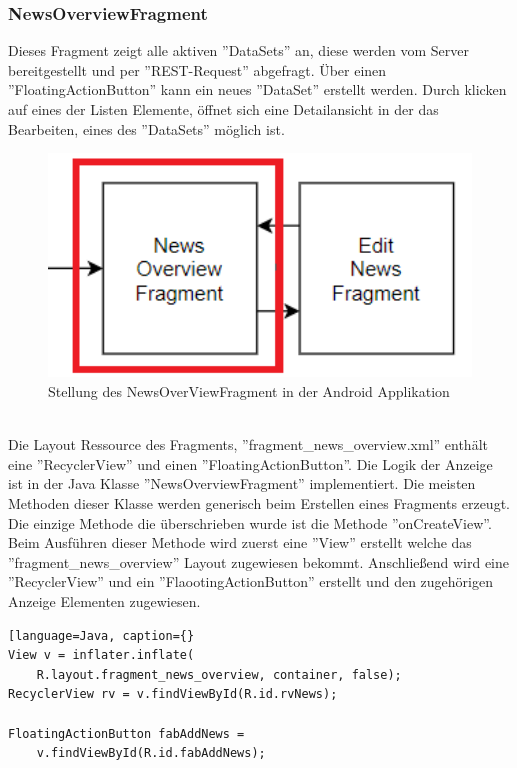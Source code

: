 \subsubsection{NewsOverviewFragment}
Dieses Fragment zeigt alle aktiven ''DataSets'' an, diese werden vom Server bereitgestellt und per ''REST-Request'' abgefragt. Über einen ''FloatingActionButton'' kann ein neues ''DataSet'' erstellt werden. Durch klicken auf eines der Listen Elemente, öffnet sich eine Detailansicht in der das Bearbeiten, eines des ''DataSets'' möglich ist.
\\
\begin{figure}[H]
\centering
\includegraphics[width=1.0\textwidth]{images/06_AndroidApp/06_NewsOverviewStellung}
\caption{Stellung des NewsOverViewFragment in der Android Applikation}
\label{fig:mediaNav}
\end{figure}
\\
Die Layout Ressource des Fragments, ''fragment\_news\_overview.xml'' enthält eine ''RecyclerView'' und einen ''FloatingActionButton''. Die Logik der Anzeige ist in der Java Klasse ''NewsOverviewFragment'' implementiert. Die meisten Methoden dieser Klasse werden generisch beim Erstellen eines Fragments erzeugt. Die einzige Methode die überschrieben wurde ist die Methode ''onCreateView''. Beim Ausführen dieser Methode wird zuerst eine ''View'' erstellt welche das ''fragment\_news\_overview'' Layout zugewiesen bekommt. Anschließend wird eine ''RecyclerView'' und ein ''FlaootingActionButton'' erstellt und den zugehörigen Anzeige Elementen zugewiesen.
\begin{lstlisting}[language=Java, caption={}
View v = inflater.inflate(
	R.layout.fragment_news_overview, container, false);
RecyclerView rv = v.findViewById(R.id.rvNews);

FloatingActionButton fabAddNews = 
    v.findViewById(R.id.fabAddNews);

\end{lstlisting}
